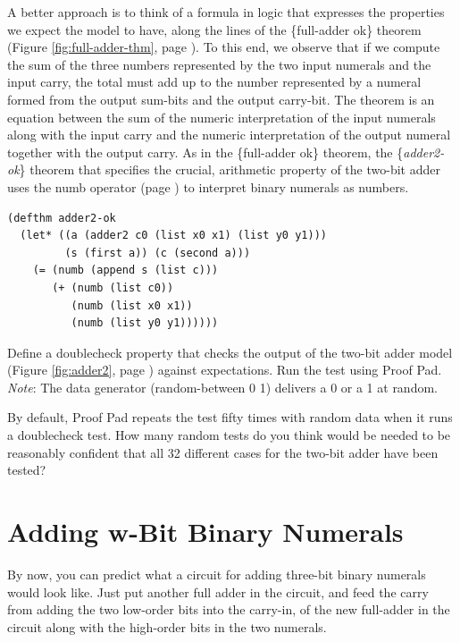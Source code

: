 A better approach is to think of a formula in logic that expresses
the properties we expect the model to have,
along the lines of the \{full-adder ok\} theorem
(Figure \ref{fig:full-adder-thm}, page \pageref{fig:full-adder-thm}).
To this end, we observe
that if we compute the sum of the three numbers represented by the two input
numerals and the input carry,
the total must add up to the number represented
by a numeral formed from the output sum-bits and
the output carry-bit.
The theorem is an equation between the
sum of the numeric interpretation of the input numerals
along with the input carry
and the numeric interpretation of the output numeral
together with the output carry.
As in the \{full-adder ok\} theorem,
the \{\emph{adder2-ok}\} theorem that specifies
the crucial, arithmetic property of the two-bit adder
uses the numb operator (page \pageref{nmb-defun})
to interpret binary numerals as numbers.

\label{adder2-ok}
\begin{Verbatim}
(defthm adder2-ok
  (let* ((a (adder2 c0 (list x0 x1) (list y0 y1)))
         (s (first a)) (c (second a)))
    (= (numb (append s (list c)))
       (+ (numb (list c0))
          (numb (list x0 x1))
          (numb (list y0 y1))))))
\end{Verbatim}

\begin{ExerciseList}
\Exercise Define a doublecheck property that checks the
output of the two-bit adder model
(Figure \ref{fig:adder2}, page \pageref{fig:adder2})
against expectations.
Run the test using Proof Pad.\\
\emph{Note}: The data generator (random-between 0 1) delivers
a 0 or a 1 at random.

\Exercise By default, Proof Pad repeats the test fifty times
with random data
when it runs a doublecheck test.
How many random tests do you think would be needed to be reasonably
confident that all 32 different cases for the two-bit adder have been tested?
\end{ExerciseList}

\section{Adding w-Bit Binary Numerals}
\label{sec:adding-w-bit-numerals}

By now, you can predict what a circuit for adding three-bit
binary numerals would look like.
Just put another full adder in the circuit, and feed the
carry from adding the two low-order bits into the carry-in,
of the new full-adder in the circuit
along with the high-order bits in the two numerals.


